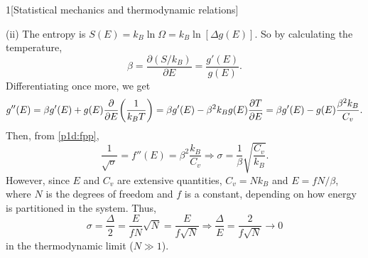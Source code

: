\documentclass[12pt]{article}
\begin{document}
\begin{problem}{1}[Statistical mechanics and thermodynamic relations]
\begin{solution}
(ii) The entropy is $S(E)=k_B\ln\Omega=k_B\ln[\Delta g(E)]$. So by calculating
the temperature,
\begin{equation}
    \beta=\frac{\partial(S/k_B)}{\partial E} =\frac{g'(E)}{g(E)}.
\end{equation}
Differentiating once more, we get
\begin{equation}
    g''(E)=\beta g'(E)+g(E)\frac{\partial}{\partial E}\qty(\frac1{k_BT})
    =\beta g'(E)-\beta^2k_Bg(E)\frac{\partial T}{\partial E}
    =\beta g'(E)-g(E)\frac{\beta^2k_B}{C_v}.
\end{equation}
Then, from \eqref{p1d:fpp},
\begin{equation}
    \frac1{\sqrt\sigma}=f''(E)=\beta^2\frac{k_B}{C_v}
    \Rightarrow\sigma=\frac1\beta\sqrt{\frac{C_v}{k_B}}.
\end{equation}
However, since $E$ and $C_v$ are extensive quantities, $C_v=Nk_B$ and
$E=fN/\beta$, where $N$ is the degrees of freedom and $f$ is a constant,
depending on how energy is partitioned in the system. Thus,
\begin{equation}
    \sigma=\frac{\Delta}{2}=\frac{E}{fN}\sqrt{N}=\frac{E}{f\sqrt{N}}
    \Rightarrow\frac{\Delta}{E}=\frac{2}{f\sqrt{N}}\to 0
\end{equation}
in the thermodynamic limit ($N\gg 1$).
\end{solution}
\newpage
\end{problem}
\end{document}

